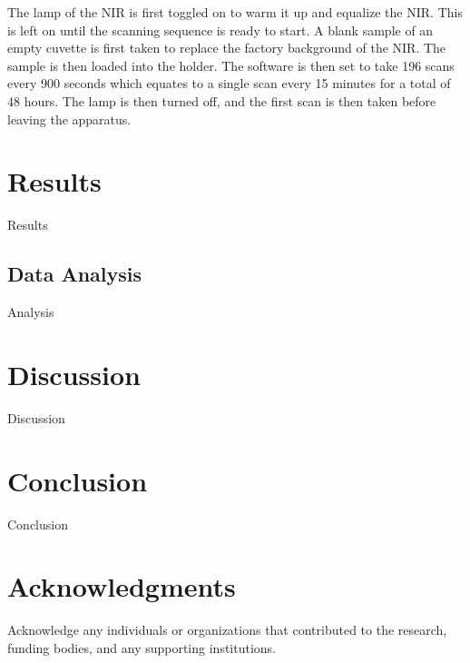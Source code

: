 \documentclass[preprint, 3p, 11pt]{elsarticle}
\begin{document}
The lamp of the NIR is first toggled on to warm it up and equalize the NIR. This is left on until the scanning sequence is ready to start. A blank sample of an empty cuvette is first taken to replace the factory background of the NIR. The sample is then loaded into the holder. The software is then set to take 196 scans every 900 seconds which equates to a single scan every 15 minutes for a total of 48 hours. The lamp is then turned off, and the first scan is then taken before leaving the apparatus. 



\section{Results}
Results

\subsection{Data Analysis}
Analysis

\section{Discussion}
Discussion

\section{Conclusion}
Conclusion

\section*{Acknowledgments}
Acknowledge any individuals or organizations that contributed to the research, funding bodies, and any supporting institutions.

\newpage

\end{document}
